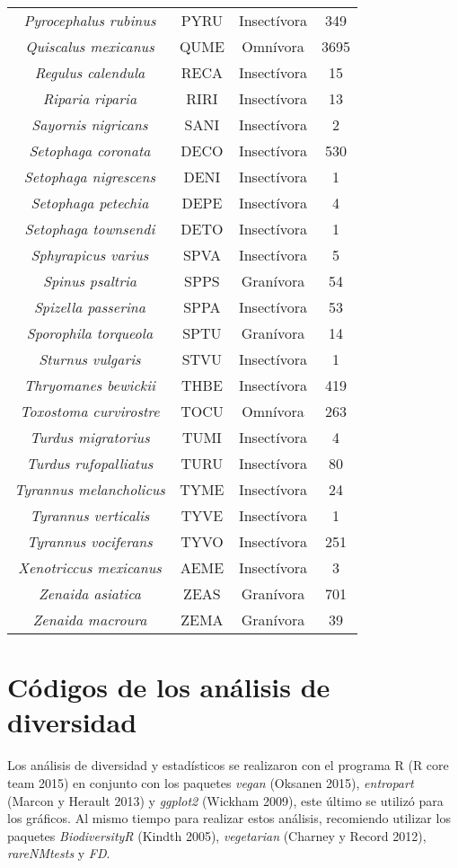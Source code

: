 \documentclass[letterpaper,12pt]{article}
\begin{document}
{\begin{longtable}[c] {|c|c|c|c|}
\textit{Pyrocephalus rubinus} & PYRU & Insectívora & 349\\
\textit{Quiscalus mexicanus} & QUME & Omnívora & 3695\\
\textit{Regulus calendula} & RECA & Insectívora & 15\\
\textit{Riparia riparia} & RIRI & Insectívora & 13\\
\textit{Sayornis nigricans} & SANI & Insectívora & 2\\
\textit{Setophaga coronata} & DECO & Insectívora & 530\\
\textit{Setophaga nigrescens} & DENI & Insectívora & 1\\
\textit{Setophaga petechia} & DEPE & Insectívora & 4\\
\textit{Setophaga townsendi} & DETO & Insectívora & 1\\
\textit{Sphyrapicus varius} & SPVA & Insectívora & 5\\
\textit{Spinus psaltria} & SPPS & Granívora & 54\\
\textit{Spizella passerina} & SPPA & Insectívora & 53\\
\textit{Sporophila torqueola} & SPTU & Granívora & 14\\
\textit{Sturnus vulgaris} & STVU & Insectívora & 1\\
\textit{Thryomanes  bewickii} & THBE & Insectívora & 419\\
\textit{Toxostoma curvirostre} & TOCU & Omnívora & 263\\
\textit{Turdus migratorius} & TUMI & Insectívora & 4\\
\textit{Turdus rufopalliatus} & TURU & Insectívora & 80\\
\textit{Tyrannus melancholicus} & TYME & Insectívora & 24\\
\textit{Tyrannus verticalis} & TYVE & Insectívora & 1\\
\textit{Tyrannus vociferans} & TYVO & Insectívora & 251\\
\textit{Xenotriccus mexicanus} & AEME & Insectívora & 3\\
\textit{Zenaida asiatica} & ZEAS & Granívora & 701\\
\textit{Zenaida macroura} & ZEMA & Granívora & 39\\ \bottomrule
\end{longtable}
}
\newpage
\section{Códigos de los análisis de diversidad}
Los análisis de diversidad y estadísticos se realizaron con el programa R (R core team 2015) en conjunto con los paquetes \textit{vegan} (Oksanen 2015), \textit{entropart} (Marcon y Herault 2013) y  \textit{ggplot2} (Wickham 2009), este último se utilizó para los gráficos. Al mismo tiempo para realizar estos análisis, recomiendo utilizar los paquetes \textit{BiodiversityR} (Kindth 2005), \textit{vegetarian} (Charney y Record 2012), \textit{rareNMtests} y \textit{FD}.
\end{document}
